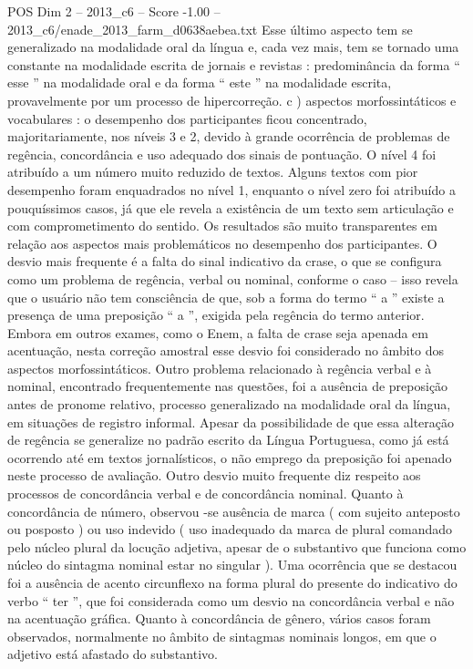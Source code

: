 \begin{textsample}{POS Dim 2 – 2013\_c6 – Score -1.00 – 2013\_c6/enade\_2013\_farm\_d0638aebea.txt}
Esse último aspecto tem se generalizado na modalidade oral da língua e, cada vez mais, tem se tornado uma constante na modalidade escrita de jornais e revistas : predominância da forma “ esse ” na modalidade oral e da forma “ este ” na modalidade escrita, provavelmente por um processo de hipercorreção. c ) aspectos morfossintáticos e vocabulares : o desempenho dos participantes ficou concentrado, majoritariamente, nos níveis 3 e 2, devido à grande ocorrência de problemas de regência, concordância e uso adequado dos sinais de pontuação.
O nível 4 foi atribuído a um número muito reduzido de textos.
Alguns textos com pior desempenho foram enquadrados no nível 1, enquanto o nível zero foi atribuído a pouquíssimos casos, já que ele revela a existência de um texto sem articulação e com comprometimento do sentido.
Os resultados são muito transparentes em relação aos aspectos mais problemáticos no desempenho dos participantes.
O desvio mais frequente é a falta do sinal indicativo da crase, o que se configura como um problema de regência, verbal ou nominal, conforme o caso – isso revela que o usuário não tem consciência de que, sob a forma do termo “ a ” existe a presença de uma preposição “ a ”, exigida pela regência do termo anterior.
Embora em outros exames, como o Enem, a falta de crase seja apenada em acentuação, nesta correção amostral esse desvio foi considerado no âmbito dos aspectos morfossintáticos.
Outro problema relacionado à regência verbal e à nominal, encontrado frequentemente nas questões, foi a ausência de preposição antes de pronome relativo, processo generalizado na modalidade oral da língua, em situações de registro informal.
Apesar da possibilidade de que essa alteração de regência se generalize no padrão escrito da Língua Portuguesa, como já está ocorrendo até em textos jornalísticos, o não emprego da preposição foi apenado neste processo de avaliação.
Outro desvio muito frequente diz respeito aos processos de concordância verbal e de concordância nominal.
Quanto à concordância de número, observou -se ausência de marca ( com sujeito anteposto ou posposto ) ou uso indevido ( uso inadequado da marca de plural comandado pelo núcleo plural da locução adjetiva, apesar de o substantivo que funciona como núcleo do sintagma nominal estar no singular ).
Uma ocorrência que se destacou foi a ausência de acento circunflexo na forma plural do presente do indicativo do verbo “ ter ”, que foi considerada como um desvio na concordância verbal e não na acentuação gráfica.
Quanto à concordância de gênero, vários casos foram observados, normalmente no âmbito de sintagmas nominais longos, em que o adjetivo está afastado do substantivo.

\end{textsample}
